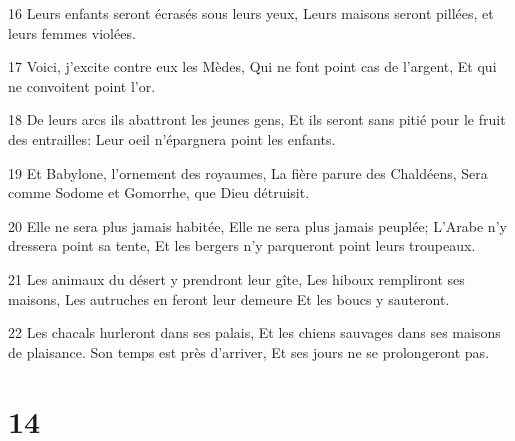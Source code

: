 \par 16 Leurs enfants seront écrasés sous leurs yeux, Leurs maisons seront pillées, et leurs femmes violées.
\par 17 Voici, j'excite contre eux les Mèdes, Qui ne font point cas de l'argent, Et qui ne convoitent point l'or.
\par 18 De leurs arcs ils abattront les jeunes gens, Et ils seront sans pitié pour le fruit des entrailles: Leur oeil n'épargnera point les enfants.
\par 19 Et Babylone, l'ornement des royaumes, La fière parure des Chaldéens, Sera comme Sodome et Gomorrhe, que Dieu détruisit.
\par 20 Elle ne sera plus jamais habitée, Elle ne sera plus jamais peuplée; L'Arabe n'y dressera point sa tente, Et les bergers n'y parqueront point leurs troupeaux.
\par 21 Les animaux du désert y prendront leur gîte, Les hiboux rempliront ses maisons, Les autruches en feront leur demeure Et les boucs y sauteront.
\par 22 Les chacals hurleront dans ses palais, Et les chiens sauvages dans ses maisons de plaisance. Son temps est près d'arriver, Et ses jours ne se prolongeront pas.

\chapter{14}

